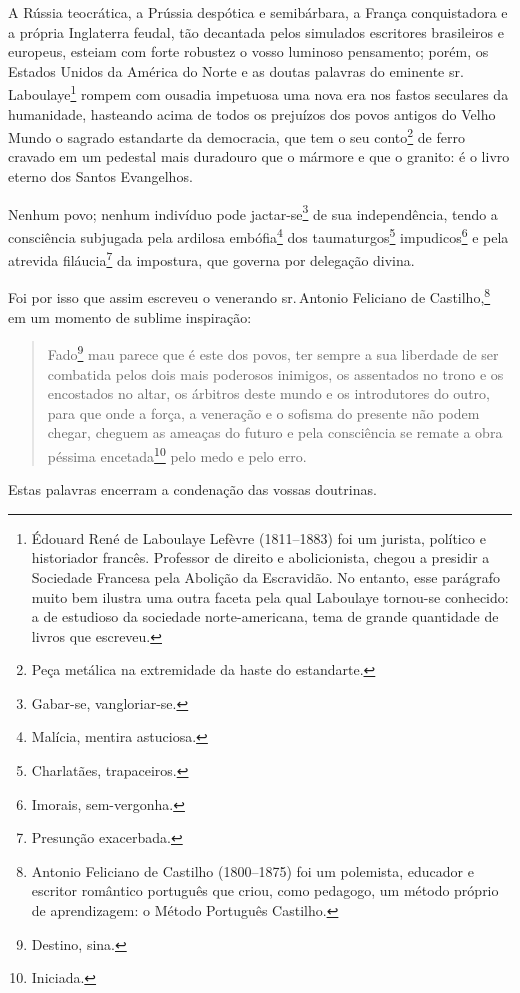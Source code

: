 A Rússia teocrática, a Prússia despótica e semibárbara, a França
conquistadora e a própria Inglaterra feudal, tão decantada pelos
simulados escritores brasileiros e europeus, esteiam com forte robustez
o vosso luminoso pensamento; porém, os Estados Unidos da América do
Norte e as doutas palavras do eminente sr.\,Laboulaye\footnote{Édouard
  René de Laboulaye Lefèvre (1811--1883) foi um jurista, político e
  historiador francês. Professor de direito e abolicionista, chegou a
  presidir a Sociedade Francesa pela Abolição da Escravidão. No entanto,
  esse parágrafo muito bem ilustra uma outra faceta pela qual Laboulaye
  tornou-se conhecido: a de estudioso da sociedade norte-americana, tema
  de grande quantidade de livros que escreveu.} rompem com ousadia
impetuosa uma nova era nos fastos seculares da humanidade, hasteando
acima de todos os prejuízos dos povos antigos do Velho Mundo o sagrado
estandarte da democracia, que tem o seu conto\footnote{Peça metálica
  na extremidade da haste do estandarte.} de ferro cravado em um
pedestal mais duradouro que o mármore e que o granito: é o livro eterno
dos Santos Evangelhos.

Nenhum povo; nenhum indivíduo pode jactar-se\footnote{Gabar-se,
  vangloriar-se.} de sua independência, tendo a consciência subjugada
pela ardilosa embófia\footnote{Malícia, mentira astuciosa.} dos
taumaturgos\footnote{Charlatães, trapaceiros.} impudicos\footnote{
  Imorais, sem-vergonha.} e pela atrevida filáucia\footnote{Presunção
  exacerbada.} da impostura, que governa por delegação divina.

Foi por isso que assim escreveu o venerando sr.\,Antonio Feliciano de
Castilho,\footnote{Antonio Feliciano de Castilho (1800--1875) foi um
  polemista, educador e escritor romântico português que criou, como
  pedagogo, um método próprio de aprendizagem: o Método Português
  Castilho.} em um momento de sublime inspiração:

\begin{quote}
Fado\footnote{Destino, sina.} mau parece que é este dos povos, ter
sempre a sua liberdade de ser combatida pelos dois mais poderosos
inimigos, os assentados no trono e os encostados no altar, os árbitros
deste mundo e os introdutores do outro, para que onde a força, a
veneração e o sofisma do presente não podem chegar, cheguem as ameaças
do futuro e pela consciência se remate a obra péssima
encetada\footnote{Iniciada.} pelo medo e pelo erro.
\end{quote}

Estas palavras encerram a condenação das vossas doutrinas.

